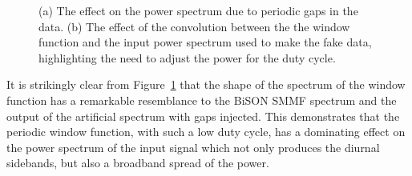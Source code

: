 \begin{figure}[ht!]
	\centering
	\qquad
	\caption{(a) The effect on the power spectrum due to periodic gaps in the data. (b) The effect of the convolution between the the window function and the input power spectrum used to make the fake data, highlighting the need to adjust the power for the duty cycle.}
	\label{fig:window_function_PSDs}
\end{figure}


It is strikingly clear from Figure~\ref{fig:window_function_PSDs} that the shape of the spectrum of the window function has a remarkable resemblance to the BiSON SMMF spectrum and the output of the artificial spectrum with gaps injected. This demonstrates that the periodic window function, with such a low duty cycle, has a dominating effect on the power spectrum of the input signal which not only produces the diurnal sidebands, but also a broadband spread of the power.

